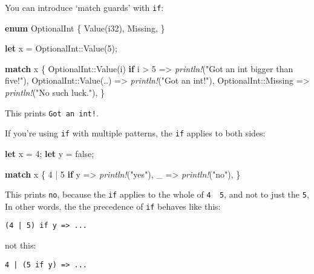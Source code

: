 \documentclass[a4paper,]{book}
\newenvironment{Shaded}{\begin{snugshade}}{\end{snugshade}}
\newcommand{\KeywordTok}[1]{\textcolor[rgb]{0.13,0.29,0.53}{\textbf{{#1}}}}
\newcommand{\DataTypeTok}[1]{\textcolor[rgb]{0.13,0.29,0.53}{{#1}}}
\newcommand{\DecValTok}[1]{\textcolor[rgb]{0.00,0.00,0.81}{{#1}}}
\newcommand{\ConstantTok}[1]{\textcolor[rgb]{0.00,0.00,0.00}{{#1}}}
\newcommand{\StringTok}[1]{\textcolor[rgb]{0.31,0.60,0.02}{{#1}}}
\newcommand{\PreprocessorTok}[1]{\textcolor[rgb]{0.56,0.35,0.01}{\textit{{#1}}}}
\newcommand{\NormalTok}[1]{{#1}}
\begin{document}
You can introduce `match guards' with \texttt{if}:

\begin{Shaded}
\begin{Highlighting}[]
\KeywordTok{enum} \NormalTok{OptionalInt \{}
    \NormalTok{Value(}\DataTypeTok{i32}\NormalTok{),}
    \NormalTok{Missing,}
\NormalTok{\}}

\KeywordTok{let} \NormalTok{x = OptionalInt::Value(}\DecValTok{5}\NormalTok{);}

\KeywordTok{match} \NormalTok{x \{}
    \NormalTok{OptionalInt::Value(i) }\KeywordTok{if} \NormalTok{i > }\DecValTok{5} \NormalTok{=> }\PreprocessorTok{println!}\NormalTok{(}\StringTok{"Got an int bigger than five!"}\NormalTok{),}
    \NormalTok{OptionalInt::Value(..) => }\PreprocessorTok{println!}\NormalTok{(}\StringTok{"Got an int!"}\NormalTok{),}
    \NormalTok{OptionalInt::Missing => }\PreprocessorTok{println!}\NormalTok{(}\StringTok{"No such luck."}\NormalTok{),}
\NormalTok{\}}
\end{Highlighting}
\end{Shaded}

This prints \texttt{Got\ an\ int!}.

If you're using \texttt{if} with multiple patterns, the \texttt{if}
applies to both sides:

\begin{Shaded}
\begin{Highlighting}[]
\KeywordTok{let} \NormalTok{x = }\DecValTok{4}\NormalTok{;}
\KeywordTok{let} \NormalTok{y = }\ConstantTok{false}\NormalTok{;}

\KeywordTok{match} \NormalTok{x \{}
    \DecValTok{4} \NormalTok{| }\DecValTok{5} \KeywordTok{if} \NormalTok{y => }\PreprocessorTok{println!}\NormalTok{(}\StringTok{"yes"}\NormalTok{),}
    \NormalTok{_ => }\PreprocessorTok{println!}\NormalTok{(}\StringTok{"no"}\NormalTok{),}
\NormalTok{\}}
\end{Highlighting}
\end{Shaded}

This prints \texttt{no}, because the \texttt{if} applies to the whole of
\texttt{4\ \textbar{}\ 5}, and not to just the \texttt{5}, In other
words, the the precedence of \texttt{if} behaves like this:

\begin{verbatim}
(4 | 5) if y => ...
\end{verbatim}

not this:

\begin{verbatim}
4 | (5 if y) => ...
\end{verbatim}
\end{document}
